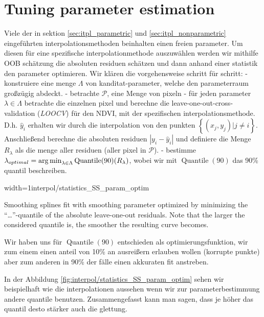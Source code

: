 \section{Tuning parameter estimation}{ \label{sec:itpl_param_est}
	Viele der in sektion \ref{sec:itpl_parametric} und \ref{sec:itpl_nonparametric} eingeführten interpolationsmethoden beinhalten einen freien parameter. Um diesen für eine spezifische interpolationmethode auszuwählen werden wir mithilfe OOB schätzung die absoluten residuen schätzen und dann anhand einer statistik den parameter optimieren. Wir klären die vorgehensweise schritt für schritt:	
	- konstruiere eine menge $\Lambda$ von kanditat-parameter, welche den parameterraum großzügig abdeckt.
	- betrachte $\mathcal{P}$, eine Menge von pixeln
	- für jeden parameter $\lambda \in \Lambda$ betrachte die einzelnen pixel und berechne die leave-one-out-cross-validation (\textit{LOOCV}) für den NDVI, mit der spezifischen interpolationsmethode. D.h. $\hat y_i$ erhalten wir durch die interpolation von den punkten $\left\{ (x_j,y_j)|j\neq i \right\}$. Anschließend berechne die absoluten residuen $|y_i - \hat y_i|$ und definiere die Menge $R_\lambda$ als die menge aller residuen (aller pixel in $\mathcal{P}$).
	- bestimme $\lambda_{optimal} = \operatorname*{arg\, min}_{\lambda\in\Lambda}\operatorname{Quantile}(90)(R_\lambda)$, wobei wir mit $\operatorname{Quantile}(90)$ das 90\% quantil beschreiben.

	\begin{my_figure}[h]{width=1\textwidth}{interpol/statistics_SS_param_optim}
		\caption{Smoothing splines fit with smoothing parameter optimized by minimizing the ``\dots''-quantile of the absolute leave-one-out residuals. Note that the larger the considered quantile is, the smoother the resulting curve becomes.}
		\label{fig:interpol/statistics_SS_param_optim}
	\end{my_figure}

	Wir haben uns für $\operatorname{Quantile}(90)$ entschieden als optimierungsfunktion, wir zum einem einen anteil von 10\% an ausreißern erlauben wollen (korrupte punkte) aber zum anderen in 90\% der fälle einen akkuraten fit anstreben. 
	
	In der Abbildung \ref{fig:interpol/statistics_SS_param_optim} sehen wir beispielhaft wie die interpolationen aussehen wenn wir zur parameterbestimmung andere quantile benutzen. Zusammengefasst kann man sagen, dass je höher das quantil desto stärker auch die glettung. 
}



